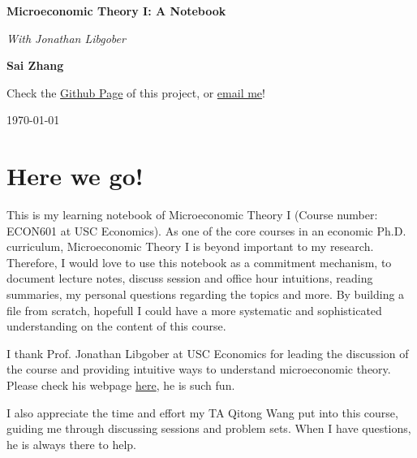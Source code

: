 \documentclass[12pt,openany]{report}
\theoremstyle{definition}
\begin{document}
\begin{titlepage}
    \begin{center}
        \vspace*{1cm}
        
        \Huge
        \textbf{Microeconomic Theory I: A Notebook}

        \Large
        \textit{With Jonathan Libgober}
            
        \vspace{2.5cm}
        
        \LARGE    
        \textbf{Sai Zhang}
            
        \vfill
        
        \large    
        Check the \href{https://github.com/SaiChrisZHANG/MicroEconLearning}{Github Page} of this project, or \href{mailto:saizhang.econ@gmail.com}{email me}!

        \vspace{0.8cm}
        \large
        \today
            
    \end{center}
\end{titlepage}


\chapter*{Here we go!}

This is my learning notebook of Microeconomic Theory I (Course number: ECON601 at USC Economics). As one of the core courses in 
an economic Ph.D. curriculum, Microeconomic Theory I is beyond important to my research. Therefore, I would love to use this notebook
as a commitment mechanism, to document lecture notes, discuss session and office hour intuitions, reading summaries, my personal questions
regarding the topics and more. By building a file from scratch, hopefull I could have a more systematic and sophisticated understanding on
the content of this course.

I thank Prof. Jonathan Libgober at USC Economics for leading the discussion of the course and providing intuitive ways to understand microeconomic theory.
Please check his webpage \href{https://www.jonlib.com/}{here}, he is such fun.

I also appreciate the time and effort my TA Qitong Wang put into this course, guiding me through discussing sessions and problem sets. When I have questions, he is 
always there to help.
\end{document}
